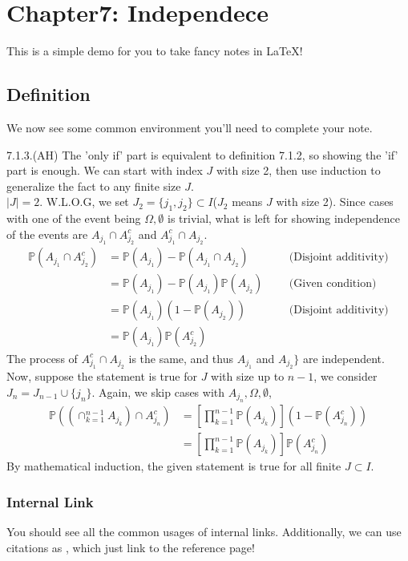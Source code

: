 \section{Chapter7: Independece}

This is a simple demo for you to take fancy notes in \LaTeX!

\subsection{Definition}
We now see some common environment you'll need to complete your note.

\begin{answer}
	7.1.3.(AH) The 'only if' part is equivalent to definition 7.1.2, so showing the 'if' part is enough. We can start with index $J$ with size 2, then use induction to generalize the fact to any finite size $J$.
	\\
	$|J|= 2$. W.L.O.G, we set $J_2 = \{j_1,j_2\} \subset I$($J_2$ means $J$ with size 2). Since cases with one of the event being $\Omega, \emptyset$ is trivial, what is left for showing independence of the events are $A_{j_1}\cap A_{j_2}^c$ and $ A_{j_1}^c \cap A_{j_2}$. 
	\begin{equation*}
		\begin{aligned}
			\mathbb{P}(A_{j_1} \cap A_{j_2}^{c}) &=  \mathbb{P}(A_{j_1}) - \mathbb{P}(A_{j_1} \cap A_{j_2})  \qquad && \text{(Disjoint additivity)}
			\\ &= \mathbb{P}(A_{j_1}) - \mathbb{P}(A_{j_1})\mathbb{P}(A_{j_2}) && \text{(Given condition)}
			\\ &= \mathbb{P}(A_{j_1})(1 - \mathbb{P}(A_{j_2})) && \text{(Disjoint additivity)}
			\\ &= \mathbb{P}(A_{j_1})\mathbb{P}(A_{j_2}^c) 
		\end{aligned}
	\end{equation*}
	The process of $A_{j_1}^c \cap A_{j_2}$ is the same, and thus $A_{j_1}$ and $A_{j_2}\}$ are independent.  
	Now, suppose the statement is true for $J$ with size up to $n-1$, we consider $J_n = J_{n-1} \cup \{j_n\}$. Again, we skip cases with $A_{j_n},\Omega, \emptyset$,
	\begin{equation*}
		\begin{aligned}
			\mathbb{P}((\cap_{k=1}^{n-1} A_{j_k}) \cap A_{j_n}^c)  &= [\prod_{k=1}^{n-1}\mathbb{P}(A_{j_k})](1 - \mathbb{P}(A_{j_n}^c))
			\\ &=  [\prod_{k=1}^{n-1}\mathbb{P}(A_{j_k})] \mathbb{P}(A_{j_n}^c) 
		\end{aligned}
	\end{equation*}
	By mathematical induction, the given statement is true for all finite $J \subset I$. 
\end{answer}


\subsubsection{Internal Link}
You should see all the common usages of internal links. Additionally, we can use citations as \cite{newton1726philosophiae}, which just link
to the reference page!
